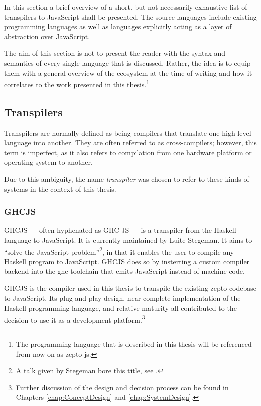 \documentclass[oneside,11pt,xetex]{scrbook}
\begin{document}
In this section a brief overview of a short, but not necessarily exhaustive list of
transpilers to JavaScript shall be presented. The source languages include
existing programming languages as well as languages explicitly acting as
a layer of abstraction over JavaScript.

The aim of this section is not to present the reader with the syntax and semantics
of every single language that is discussed. Rather, the idea is to equip them with a
general overview of the ecosystem at the time of writing and how it correlates to
the work presented in this thesis.\footnote{The programming language that is described
in this thesis will be referenced from now on as zepto-js.}

\subsection{Transpilers}
\label{trans}

Transpilers are normally defined as being compilers that translate one high level language
into another. They are often referred to as cross-compilers; however, this term is imperfect,
as it also refers to compilation from one hardware platform or operating system to
another.

Due to this ambiguity, the name \textit{transpiler} was chosen to refer to these
kinds of systems in the context of this thesis.

\subsubsection{GHCJS}
\label{sec:GHCJS}

GHCJS --- often hyphenated as GHC-JS --- is a transpiler from the Haskell language
to JavaScript. It is currently maintained by Luite Stegeman. It aims to ``solve
the JavaScript problem''\footnote{A talk given by Stegeman bore this title, see
\parencite{STEG}.}, in that it enables the user to compile any Haskell program to JavaScript.
GHCJS does so by insterting a custom compiler backend into the \gls{ghc} toolchain
that emits JavaScript instead of machine code.

GHCJS is the compiler used in this thesis to transpile the existing zepto codebase
to JavaScript. Its plug-and-play design, near-complete implementation of the
Haskell programming language, and relative maturity all contributed to the decision
to use it as a development platform.\footnote{Further discussion of the design
and decision process can be found in Chapters \ref{chap:ConceptDesign} and
\ref{chap:SystemDesign}.}
\end{document}
